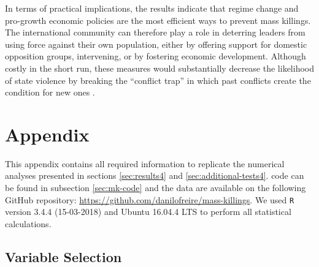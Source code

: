 In terms of practical implications, the results indicate that regime change and pro-growth economic policies are the most efficient ways to prevent mass killings. The international community can therefore play a role in deterring leaders from using force against their own population, either by offering support for domestic opposition groups, intervening, or by fostering economic development. Although costly in the short run, these measures would substantially decrease the likelihood of state violence by breaking the ``conflict trap'' in which past conflicts create the condition for new ones \citep{collier2003breaking}. 

\newpage

\section{Appendix} 
\label{sec:mk-appendix}

This appendix contains all required information to replicate the numerical analyses presented in sections \ref{sec:results4} and \ref{sec:additional-tests4}.  code can be found in subsection \ref{sec:mk-code} and the data are available on the following GitHub repository: \href{https://github.com/danilofreire/mass-killings}{https://github.com/danilofreire/mass-killings}. We used \texttt{R} version 3.4.4 (15-03-2018) and Ubuntu 16.04.4 LTS to perform all statistical calculations.

\subsection{Variable Selection}
\label{sec:mk-vs}

